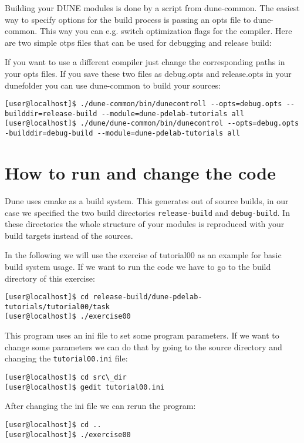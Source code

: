 \documentclass[12pt,a4paper]{article}
\begin{document}
Building your DUNE modules is done by a script from dune-common.  The
easiest way to specify  options for the build process is passing an
opts file to dune-common.  This way you can e.g. switch optimization
flags for the compiler.  Here are two simple otps files that can be
used for debugging and release build:




If you want to use a different compiler just change the corresponding
paths in your opts files.  If you save these two files as debug.opts
and release.opts in your dunefolder you can use dune-common to build
your sources:

\begin{lstlisting}
[user@localhost]$ ./dune-common/bin/dunecontroll --opts=debug.opts --builddir=release-build --module=dune-pdelab-tutorials all
[user@localhost]$ ./dune/dune-common/bin/dunecontrol --opts=debug.opts -builddir=debug-build --module=dune-pdelab-tutorials all
\end{lstlisting}

\section{How to run and change the code}

Dune uses cmake as a build system.  This generates out of source
builds, in our case we specified the two build directories
\lstinline{release-build} and \lstinline{debug-build}.  In these
directories the whole structure of your modules is reproduced with
your build targets instead of the sources.

In the following we will use the exercise of tutorial00 as an example
for basic build system usage. If we want to run the code we have to go
to the build directory of this exercise:
\begin{lstlisting}
[user@localhost]$ cd release-build/dune-pdelab-tutorials/tutorial00/task
[user@localhost]$ ./exercise00
\end{lstlisting}

This program uses an ini file to set some program parameters. If we
want to change some parameters we can do that by going to the source
directory and changing the \lstinline{tutorial00.ini} file:
\begin{lstlisting}
[user@localhost]$ cd src\_dir
[user@localhost]$ gedit tutorial00.ini
\end{lstlisting}
After changing the ini file we can rerun the program:
\begin{lstlisting}
[user@localhost]$ cd ..
[user@localhost]$ ./exercise00
\end{lstlisting}
\end{document}
